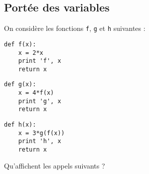 \subsection*{Portée des variables}
On considère les fonctions {\tt f}, {\tt g} et {\tt h} suivantes :
\begin{center}
\begin{py}{4cm}
\begin{verbatim}
def f(x):
    x = 2*x
    print 'f', x
    return x
\end{verbatim}
\end{py}\hspace*{1cm}
\begin{py}{4cm}
\begin{verbatim}
def g(x):
    x = 4*f(x)
    print 'g', x
    return x
\end{verbatim}
\end{py}\hspace*{1cm}
\begin{py}{4cm}
\begin{verbatim}
def h(x):
    x = 3*g(f(x))
    print 'h', x
    return x
\end{verbatim}
\end{py}
\end{center}

Qu'affichent les appels suivants ?
\vspace*{2mm}

